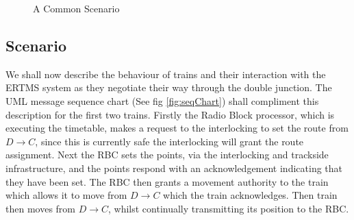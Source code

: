 \begin{figure}[h!]
\begin{center}

\end{center}

 \caption{A Common Scenario}
\label{fig:trackplandd}
\end{figure}

\subsection*{Scenario}
We shall now describe the behaviour of trains and their interaction with the ERTMS system as they negotiate their way through the double junction. The UML message sequence chart (See fig \ref{fig:seqChart}) shall compliment this description for the first two trains. Firstly the Radio Block processor, which is executing the timetable, makes a request to the interlocking to set the route from $D \to C$, since this is currently safe the interlocking will grant the route assignment. Next the RBC sets the points, via the interlocking and trackside infrastructure, and the points respond with an acknowledgement indicating that they have been set. The RBC then grants a movement authority to the train which allows it to move from $D \to C$ which the train acknowledges. Then train then moves from $D \to C$, whilst continually transmitting its position to the RBC.

